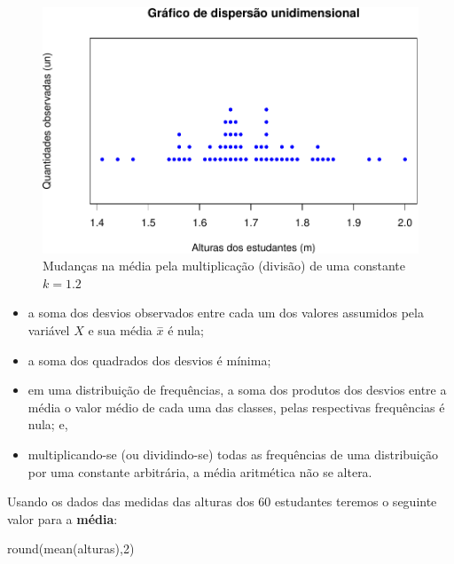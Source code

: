 \documentclass[
]{book}
\newenvironment{Shaded}{\begin{snugshade}}{\end{snugshade}}
\newcommand{\DecValTok}[1]{\textcolor[rgb]{0.00,0.00,0.81}{#1}}
\newcommand{\FunctionTok}[1]{\textcolor[rgb]{0.00,0.00,0.00}{#1}}
\newcommand{\NormalTok}[1]{#1}
\providecommand{\tightlist}{%
  \setlength{\itemsep}{0pt}\setlength{\parskip}{0pt}}
\begin{document}
\begin{figure}

{\centering \includegraphics[width=0.8\linewidth]{apostila_files/figure-latex/unnamed-chunk-20-1} 

}

\caption{Mudanças na média pela multiplicação (divisão) de uma constante $k=1.2$}\label{fig:unnamed-chunk-20}
\end{figure}

\hfill\break

\begin{itemize}
\tightlist
\item
  a soma dos desvios observados entre cada um dos valores assumidos pela variável \(X\) e sua média \(\stackrel{-}{x}\) é nula;
\item
  a soma dos quadrados dos desvios é mínima;
\item
  em uma distribuição de frequências, a soma dos produtos dos desvios entre a média o valor médio de cada uma das classes, pelas respectivas frequências é nula; e,
\item
  multiplicando-se (ou dividindo-se) todas as frequências de uma distribuição por uma constante arbitrária, a média aritmética não se altera.
\end{itemize}

\hfill\break

Usando os dados das medidas das alturas dos 60 estudantes teremos o seguinte valor para a \textbf{média}:

\hfill\break

\begin{Shaded}
\begin{Highlighting}[]
\FunctionTok{round}\NormalTok{(}\FunctionTok{mean}\NormalTok{(alturas),}\DecValTok{2}\NormalTok{)}
\end{Highlighting}
\end{Shaded}
\end{document}
